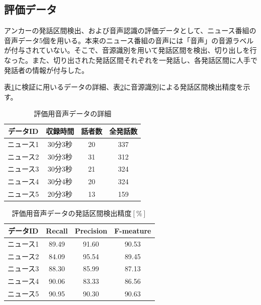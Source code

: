\subsection{評価データ}
アンカーの発話区間検出、および音声認識の評価データとして、ニュース番組の音声データ5個を用いる。本来のニュース番組の音声には「音声」の音源ラベルが付与されていない。そこで、音源識別を用いて発話区間を検出、切り出しを行なった。また、切り出された発話区間それぞれを一発話し、各発話区間に人手で発話者の情報が付与した。\par
表\ref{table:test_detail}に検証に用いるデータの詳細、表\ref{table:test_detail_RPF}に音源識別による発話区間検出精度を示す。

\begin{table}[H]
  \begin{center}
    \caption{評価用音声データの詳細 \label{table:test_detail}}
    \begin{tabular}{|c||c|c|c|} \hline
      データID & 収録時間 & 話者数 & 全発話数 \\ \hline
      ニュース1 & 30分3秒 & 20 & 337 \\ \hline
      ニュース2 & 30分3秒 & 31 & 312\\ \hline
      ニュース3 & 30分3秒 & 21 & 324 \\ \hline
      ニュース4 & 30分4秒 & 20 & 324\\ \hline
      ニュース5 & 20分3秒 & 13 & 159\\ \hline
    \end{tabular}
  \end{center}
\end{table}

\begin{table}[H]
  \begin{center}
    \caption{評価用音声データの発話区間検出精度$[\%]$ \label{table:test_detail_RPF}}
    \begin{tabular}{|c||c|c|c|} \hline
      データID & Recall & Precision & F-meature \\ \hline
      ニュース1 & 89.49 & 91.60 & 90.53 \\ \hline
      ニュース2 & 84.09 & 95.54 & 89.45\\ \hline
      ニュース3 & 88.30 & 85.99 & 87.13 \\ \hline
      ニュース4 & 90.06 & 83.33 & 86.56\\ \hline
      ニュース5 & 90.95 & 90.30 & 90.63\\ \hline
    \end{tabular}
  \end{center}
\end{table}


